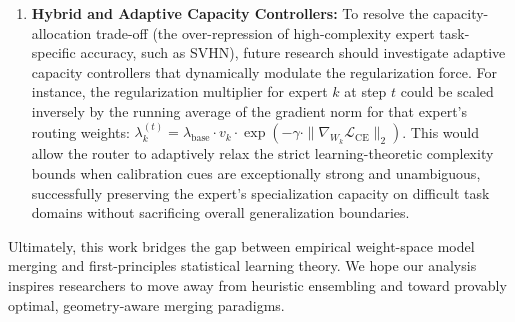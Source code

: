 \begin{enumerate}
    \item \textbf{Hybrid and Adaptive Capacity Controllers:} To resolve the capacity-allocation trade-off (the over-repression of high-complexity expert task-specific accuracy, such as SVHN), future research should investigate adaptive capacity controllers that dynamically modulate the regularization force. For instance, the regularization multiplier for expert $k$ at step $t$ could be scaled inversely by the running average of the gradient norm for that expert's routing weights: $\lambda_k^{(t)} = \lambda_{\text{base}} \cdot v_k \cdot \exp\left(-\gamma \cdot \|\nabla_{W_k} \mathcal{L}_{\text{CE}}\|_2\right)$. This would allow the router to adaptively relax the strict learning-theoretic complexity bounds when calibration cues are exceptionally strong and unambiguous, successfully preserving the expert's specialization capacity on difficult task domains without sacrificing overall generalization boundaries.
\end{enumerate}

Ultimately, this work bridges the gap between empirical weight-space model merging and first-principles statistical learning theory. We hope our analysis inspires researchers to move away from heuristic ensembling and toward provably optimal, geometry-aware merging paradigms.
